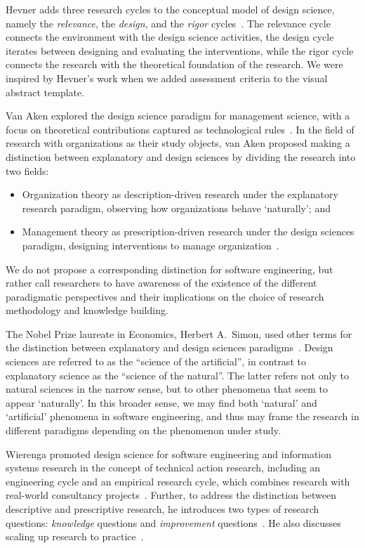 \documentclass[graybox]{svmult}
\newcommand{\peggy}[1]{\textcolor{blue}{{\it [Peggy says: #1]}}}
\newcommand{\peggy}[1]{}
\begin{document}
Hevner adds three research cycles to the conceptual model of design science, namely the \emph{relevance}, the \emph{design}, and the \emph{rigor} cycles~\cite{Hevner2007}. The relevance cycle connects the environment with the design science activities, the design cycle iterates between designing and evaluating the interventions, while the rigor cycle connects the research with the theoretical foundation of the research. We were inspired by Hevner's work when we added assessment criteria to the visual abstract template.


Van Aken explored the design science paradigm for management science, with a focus on theoretical contributions captured as technological rules~\cite{van_aken_management_2004,van_aken_management_2005}. 
In the field of research with organizations as their study objects, van Aken proposed making a distinction between explanatory and design sciences by dividing the research into two fields: 
\begin{itemize}
\item Organization theory as description-driven research under the explanatory research paradigm, observing how organizations behave `naturally'; and 
\item Management theory as prescription-driven research under the design sciences paradigm, designing interventions to manage organization~\cite{van_aken_management_2004}.  
\end{itemize}

We do not propose a corresponding distinction for software engineering, but rather call researchers to have awareness of the existence of the different paradigmatic perspectives and their implications on the choice of research methodology and knowledge building.

The Nobel Prize laureate in Economics, Herbert A.\ Simon, used other terms for the distinction between explanatory and design sciences paradigms~\cite{Simons69}. Design sciences are referred to as the ``science of the artificial'', in contrast to explanatory science as the ``science of the natural''. The latter refers not only to natural sciences in the narrow sense, but to other phenomena that seem to appear `naturally'. In this broader sense, we may find both `natural' and `artificial' phenomena in software engineering, and thus may frame the research in different paradigms depending on the phenomenon under study. 


Wierenga promoted design science for software engineering and information systems research in the concept of technical action research, including an engineering cycle and an empirical research cycle, which combines research with real-world consultancy projects~\cite{wieringa_six_2015,wieringa_technical_2012,wieringa_what_2014}. Further, to address the distinction between descriptive and prescriptive research, he introduces two types of research questions: \emph{knowledge} questions and \emph{improvement} questions~\cite{wieringa_design_2009}. He also discusses scaling up research to practice~\cite{Wieringa2014}. 
\end{document}
